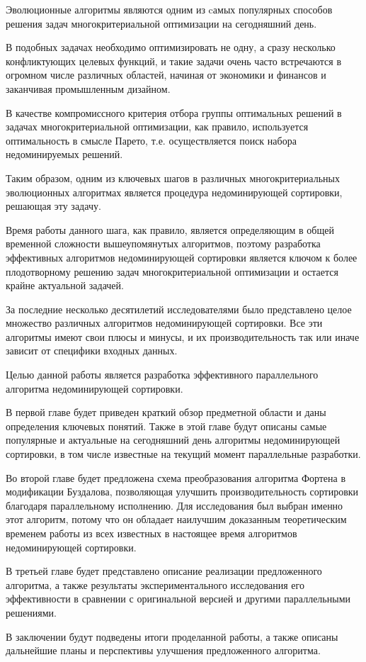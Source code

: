 \startprefacepage
Эволюционные алгоритмы являются одним из cамых популярных способов решения задач многокритериальной оптимизации на сегодняшний день.

В подобных задачах необходимо оптимизировать не одну, а сразу несколько конфликтующих целевых функций, и такие задачи очень часто встречаются в огромном числе различных областей, начиная от экономики и финансов и заканчивая промышленным дизайном.

В качестве компромиссного критерия отбора группы оптимальных решений в задачах многокритериальной оптимизации, как правило, используется оптимальность в смысле Парето, т.е. осуществляется поиск набора недоминируемых решений.

Таким образом, одним из ключевых шагов в различных многокритериальных эволюционных алгоритмах является процедура недоминирующей сортировки, решающая эту задачу.

Время работы данного шага, как правило, является определяющим в общей временной сложности вышеупомянутых алгоритмов, поэтому разработка эффективных алгоритмов недоминирующей сортировки является ключом к более плодотворному решению задач многокритериальной оптимизации и остается крайне актуальной задачей.

За последние несколько десятилетий исследователями было представлено целое множество различных алгоритмов недоминирующей сортировки.
Все эти алгоритмы имеют свои плюсы и минусы, и их производительность так или иначе зависит от специфики входных данных.

Целью данной работы является разработка эффективного параллельного алгоритма недоминирующей сортировки.

В первой главе будет приведен краткий обзор предметной области и даны определения ключевых понятий.
Также в этой главе будут описаны самые популярные и актуальные на сегодняшний день алгоритмы недоминирующей сортировки, в том числе известные на текущий момент параллельные разработки.

Во второй главе будет предложена схема преобразования алгоритма Фортена в модификации Буздалова, позволяющая улучшить производительность сортировки благодаря параллельному исполнению.
Для исследования был выбран именно этот алгоритм, потому что он обладает наилучшим доказанным теоретическим временем работы из всех известных в настоящее время алгоритмов недоминирующей сортировки.

В третьей главе будет представлено описание реализации предложенного алгоритма, а также результаты экспериментального исследования его эффективности в сравнении с оригинальной версией и другими параллельными решениями.

В заключении будут подведены итоги проделанной работы, а также описаны дальнейшие планы и перспективы улучшения предложенного алгоритма.
